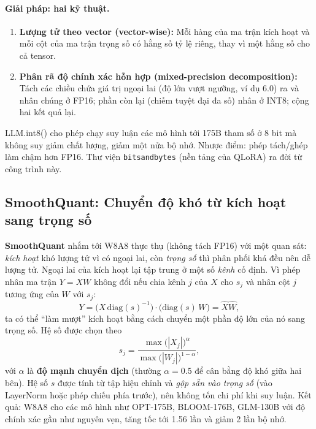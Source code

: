 \paragraph{Giải pháp: hai kỹ thuật.}
\begin{enumerate}
	\item \textbf{Lượng tử theo vector (vector-wise):} Mỗi hàng của ma trận kích hoạt và mỗi cột của ma trận trọng số có hằng số tỷ lệ riêng, thay vì một hằng số cho cả tensor.
	\item \textbf{Phân rã độ chính xác hỗn hợp (mixed-precision decomposition):} Tách các chiều chứa giá trị ngoại lai (độ lớn vượt ngưỡng, ví dụ 6.0) ra và nhân chúng ở FP16; phần còn lại (chiếm tuyệt đại đa số) nhân ở INT8; cộng hai kết quả lại.
\end{enumerate}
LLM.int8() cho phép chạy suy luận các mô hình tới 175B tham số ở 8 bit mà không suy giảm chất lượng, giảm một nửa bộ nhớ. Nhược điểm: phép tách/ghép làm chậm hơn FP16. Thư viện \texttt{bitsandbytes} (nền tảng của QLoRA) ra đời từ công trình này.

\subsection{SmoothQuant: Chuyển độ khó từ kích hoạt sang trọng số}
\label{ssec:smoothquant}
\textbf{SmoothQuant} \cite{xiao2023smoothquant} nhắm tới W8A8 thực thụ (không tách FP16) với một quan sát: \emph{kích hoạt} khó lượng tử vì có ngoại lai, còn \emph{trọng số} thì phân phối khá đều nên dễ lượng tử. Ngoại lai của kích hoạt lại tập trung ở một số \emph{kênh} cố định. Vì phép nhân ma trận $Y = XW$ không đổi nếu chia kênh $j$ của $X$ cho $s_j$ và nhân cột $j$ tương ứng của $W$ với $s_j$:
\[
Y = \big(X\,\text{diag}(s)^{-1}\big)\cdot\big(\text{diag}(s)\,W\big) = \hat{X}\hat{W},
\]
ta có thể “làm mượt” kích hoạt bằng cách chuyển một phần độ lớn của nó sang trọng số. Hệ số được chọn theo
\[
s_j = \frac{\max\big(|X_j|\big)^{\alpha}}{\max\big(|W_j|\big)^{1-\alpha}},
\]
với $\alpha$ là \textbf{độ mạnh chuyển dịch} (thường $\alpha = 0.5$ để cân bằng độ khó giữa hai bên). Hệ số $s$ được tính từ tập hiệu chỉnh và \emph{gộp sẵn vào trọng số} (vào LayerNorm hoặc phép chiếu phía trước), nên không tốn chi phí khi suy luận. Kết quả: W8A8 cho các mô hình như OPT-175B, BLOOM-176B, GLM-130B với độ chính xác gần như nguyên vẹn, tăng tốc tới 1.56 lần và giảm 2 lần bộ nhớ.

\begin{center}
\label{fig:smoothquant}
\end{center}

